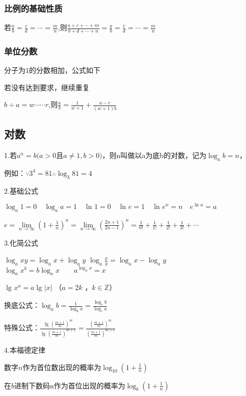 \documentclass[UTF8]{ctexart}
\begin{document}
\subsubsection{比例的基础性质}

若$\frac{a}{b}=\frac{c}{d}=\cdots=\frac{m}{n}$,则$\frac{a+c+\cdots+m}{b+d+\cdots+n}=\frac{a}{b}=\frac{c}{d}=\cdots=\frac{m}{n}$

\subsubsection{单位分数}分子为$1$的分数相加，公式如下

若没有达到要求，继续重复

$b÷a=w\cdots \cdots r$,则$\frac{a}{b}=\frac{1}{w+1}+\frac{a-r}{(w+1)b}$


\subsection{对数}

1.若$a^{n} =b(a> 0$且$a\ne 1,b> 0)$，则n叫做以a为底b的对数，记为$\log_{a}{b}=n$，

例如：$  \because 3^4=81 \therefore \log_{3}{81}=4 $

2.基础公式

$ \log_{a}{1}=0 \quad \log_{a}{a}=1 \quad \ln_{}{1} =0\quad \ln_{}{e} =1\quad \ln_{}{e^{n} } =n
\quad e^{\ln_{}{a} } =a$

$e=\lim\limits_{n \to \infty} (1+\frac{1}{n} )^{n} =\lim\limits_{n \to \infty} (\frac{2n+1}{2n-1} )^{n}
=\frac{1}{0!} +\frac{1}{1!} +\frac{1}{2!} +\frac{1}{3!} +\cdots$

3.化简公式

$\log_{a}{xy} =\log_{a}{x}+\log_{a}{y}  $
\qquad $\log_{a}{\frac{x}{y} } =\log_{a}{x} -\log_{a}{y}$ 
\qquad $\log_{a}{x^{b} } =b\log_{a}{x} \qquad a^{\log_{a}{x} } =x$ 

$\lg_{}{x^{a} } =a\lg_{}{\left | x \right | }$ （$a=2k$ ，$k \in \mathbb{Z}$）

换底公式：$\log_{a}{b} =\frac{1}{\log_{b}{a} } =\frac{\log_{c}{b} }{\log_{c}{a} } $

特殊公式：$ \frac{\lg_{}{(\frac{m+1}{m} )^m} }{\lg_{}{(\frac{m+1}{m} )^{m+1}} }=\frac{(\frac{m+1}{m}
)^m}{(\frac{m+1}{m} )^{m+1}} $

4.本福德定律

数字$n$作为首位数出现的概率为$\log_{10}{(1+\frac{1}{n}) } $

在$b$进制下数码n作为首位出现的概率为$\log_{b}{(1+\frac{1}{n}) } $
\end{document}
